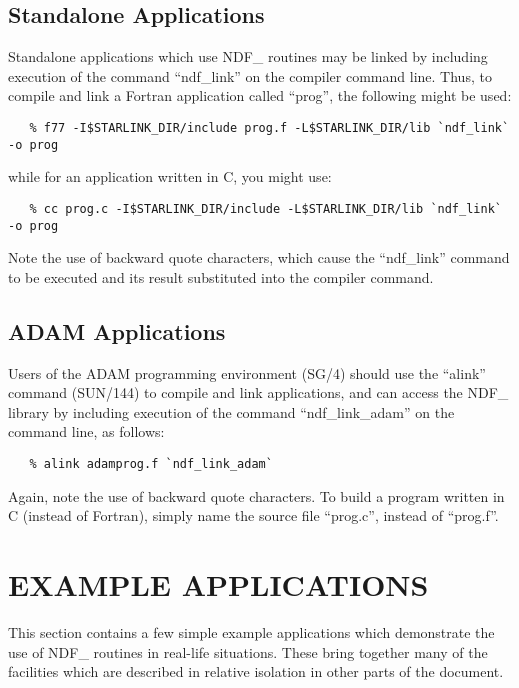 \documentclass[twoside,11pt]{article}
\newcommand{\xref}[3]{#1}
\newcommand{\xlabel}[1]{}
\newcommand{\latex}[1]{#1}
\begin{document}
\subsection{Standalone Applications}
Standalone applications which use NDF\_ routines may be linked by
including execution of the command ``ndf\_link'' on the compiler
command line. Thus, to compile and link a Fortran application called
``prog'', the following might be used:

\small
\begin{verbatim}
   % f77 -I$STARLINK_DIR/include prog.f -L$STARLINK_DIR/lib `ndf_link` -o prog
\end{verbatim}
\normalsize

while for an application written in C, you might use:

\small
\begin{verbatim}
   % cc prog.c -I$STARLINK_DIR/include -L$STARLINK_DIR/lib `ndf_link` -o prog
\end{verbatim}
\normalsize

Note the use of backward quote characters, which cause the
``ndf\_link'' command to be executed and its result substituted into
the compiler command.

\subsection{\label{ss:buildingadamapplications}ADAM Applications}
Users of the \xref{ADAM}{sg4}{} programming environment
\latex{(SG/4)} should use
the ``\xref{alink}{sun144}{ADAM_link_scripts}'' command
(\xref{SUN/144}{sun144}{}) to compile and link applications, and can
access
the NDF\_ library by including execution of the command
``ndf\_link\_adam'' on the command line, as follows:

\small
\begin{verbatim}
   % alink adamprog.f `ndf_link_adam`
\end{verbatim}
\normalsize

Again, note the use of backward quote characters. To build a program
written in C (instead of Fortran), simply name the source file
``prog.c'', instead of ``prog.f''.

\newpage
\appendix
\section{\xlabel{example_applications}\label{ss:exampleapplications}EXAMPLE APPLICATIONS}

This section contains a few simple example applications which demonstrate the
use of NDF\_ routines in real-life situations. These bring together many of the
facilities which are described in relative isolation in other parts of the
document.
\end{document}
